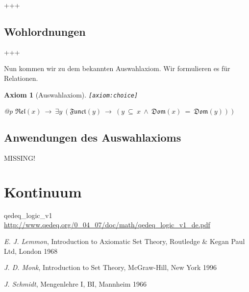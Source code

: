 \documentclass[a4paper,german,10pt,twoside]{book}
\newtheorem{ax}{Axiom}
\theoremstyle{definition}
\theoremstyle{remark}
\begin{document}
+++

\section{Wohlordnungen} \label{chapter7_section1} \hypertarget{chapter7_section1}{}
+++

\par
Nun kommen wir zu dem bekannten Auswahlaxiom. Wir formulieren es f{\"u}r Relationen.

\begin{ax}[Auswahlaxiom]
\label{axiom:choice} \hypertarget{axiom:choice}{}
{\tt \tiny [\verb]axiom:choice]]}
\mbox{}
\begin{longtable}{{@{\extracolsep{\fill}}p{\linewidth}}}
\centering $\mathfrak{Rel}(x)\ \rightarrow\ \exists y\ (\mathfrak{Funct}(y)\ \rightarrow\ (y \ \subseteq \ x\ \land\ \mathfrak{Dom}(x) \ = \ \mathfrak{Dom}(y)))$
\end{longtable}

\end{ax}


\section{Anwendungen des Auswahlaxioms} \label{chapter7_section2} \hypertarget{chapter7_section2}{}
MISSING!



\chapter{Kontinuum} \label{chapter8} \hypertarget{chapter8}{}




\backmatter

\begin{thebibliography}{99}


 qedeq\_logic\_v1 \url{http://www.qedeq.org/0_04_07/doc/math/qedeq_logic_v1_de.pdf}



 \emph{E. J. Lemmon}, Introduction to Axiomatic Set Theory, Routledge \& Kegan Paul Ltd, London 1968

 \emph{J. D. Monk}, Introduction to Set Theory, McGraw-Hill, New York 1996

 \emph{J. Schmidt}, Mengenlehre I, BI, Mannheim 1966

\end{thebibliography}
 \printindex
\end{document}
